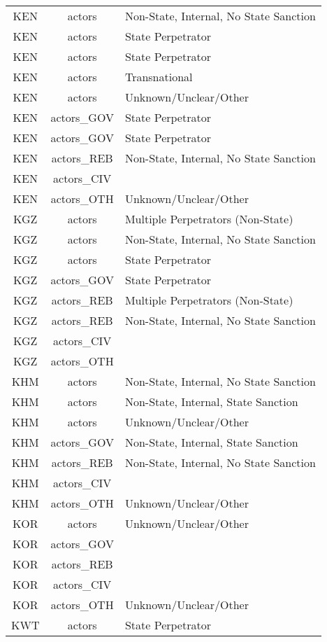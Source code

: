 \documentclass[12pt]{article}
\begin{document}
\begin{center}
\begin{longtable}{|c|c|p{10cm}|}
  KEN & actors & Non-State, Internal, No State Sanction \\ 
  KEN & actors & State Perpetrator \\ 
  KEN & actors & State Perpetrator \\ 
  KEN & actors & Transnational \\ 
  KEN & actors & Unknown/Unclear/Other \\ 
  KEN & actors\_GOV & State Perpetrator \\ 
  KEN & actors\_GOV & State Perpetrator \\ 
  KEN & actors\_REB & Non-State, Internal, No State Sanction \\ 
  KEN & actors\_CIV &  \\ 
  KEN & actors\_OTH & Unknown/Unclear/Other \\ 
  KGZ & actors & Multiple Perpetrators (Non-State) \\ 
  KGZ & actors & Non-State, Internal, No State Sanction \\ 
  KGZ & actors & State Perpetrator \\ 
  KGZ & actors\_GOV & State Perpetrator \\ 
  KGZ & actors\_REB & Multiple Perpetrators (Non-State) \\ 
  KGZ & actors\_REB & Non-State, Internal, No State Sanction \\ 
  KGZ & actors\_CIV &  \\ 
  KGZ & actors\_OTH &  \\ 
  KHM & actors & Non-State, Internal, No State Sanction \\ 
  KHM & actors & Non-State, Internal, State Sanction \\ 
  KHM & actors & Unknown/Unclear/Other \\ 
  KHM & actors\_GOV & Non-State, Internal, State Sanction \\ 
  KHM & actors\_REB & Non-State, Internal, No State Sanction \\ 
  KHM & actors\_CIV &  \\ 
  KHM & actors\_OTH & Unknown/Unclear/Other \\ 
  KOR & actors & Unknown/Unclear/Other \\ 
  KOR & actors\_GOV &  \\ 
  KOR & actors\_REB &  \\ 
  KOR & actors\_CIV &  \\ 
  KOR & actors\_OTH & Unknown/Unclear/Other \\ 
  KWT & actors & State Perpetrator \\ 

\end{longtable}
\end{center}
\end{document}
